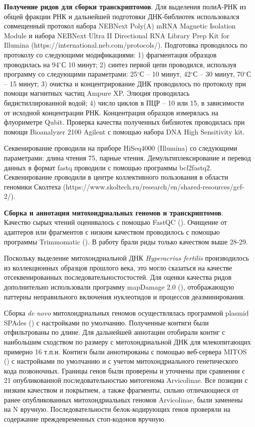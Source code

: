 \textbf{Получение ридов для сборки транскриптомов}. Для выделения полиА-РНК из общей фракции РНК и дальнейшей подготовки ДНК-библиотек использовался совмещенный протокол набора NEBNext Poly(A) mRNA Magnetic Isolation Module и набора NEBNext Ultra II Directional RNA Library Prep Kit for Illumina (https://international.neb.com/protocols/). Подготовка проводилось по протоколу со следующими модификациями: 
1) фрагментация образцов проводилась на 94$^\circ$С 10 минут; 
2) синтез первой цепи проводился, используя программу со следующими параметрами: 25$^\circ$С -- 10 минут, 42$^\circ$С -- 30 минут, 70$^\circ$С -- 15 минут; 
3) очистка и концентрирование ДНК проводилось по протоколу при помощи магнитных частиц Ampure XP. Элюция проводилась бидистиллированной водой; 
4) число циклов в ПЦР -- 10 или 15, в зависимости от исходной концентрации РНК. 
Концентрация образцов измерялась на флуориметре Qubit. Проверка качества полученных библиотек проводилась при помощи Bioanalyzer 2100 Agilent с помощью набора DNA High Sensitivity kit. 

Секвенирование проводили на приборе HiSeq4000 (Illumina) со следующими параметрами: длина чтения 75, парные чтения. Демультиплексирование и перевод данных в формат fastq проводили с помощью программы bcl2fastq2. Секвенирование проводили в центре коллективного пользования в области геномики Сколтеха (https://www.skoltech.ru/research/en/shared-resources/gcf-2/).

\textbf{Сборка и аннотация митохондриальных геномов и транскриптомов}. Качество сырых чтений оценивалось с помощью FastQC (\cite{Andrews2010}). Очищение от адаптеров или фрагментов с низким качеством проводилось с помощью программы Trimmomatic (\cite{Bolger2014}). В работу брали риды только качеством выше 28-29.

Поскольку выделение митохондриальной ДНК \textit{Hyperacrius fertilis} производилось из коллекционных образцов прошлого века, это могло сказаться на качестве отсеквенированных последовательностостостей. Для оценки качества ридов дополнительно использовали программу mapDamage 2.0 (\cite{Jonsson2013}), отображающую паттерны неправильного включения нуклеотидов и процессов деазминирования. 

Сборка \textit{de novo} митохондриальных геномов осуществлялась программой plasmid SPAdes (\cite{Bankevich2012}) с настройками по умолчанию. Полученные контиги были отфильтрованы по длине. Для дальнейшей аннотации отобирали контиг с наибольшим сходством по размеру с митохондриальной ДНК для млекопитающих примерно 16 т.п.н. Контиги были аннотированы с помощью веб-сервера MITOS (\cite{Bernt2013}) с настройками по умолчанию и с учетом митохондриального генетического кода позвоночных. Границы генов были проверены и уточнены при сравнении с 21 опубликованной последовательностью митогенома Arvicolinae. Все позиции с низким качеством и покрытием, а также фрагменты, сильно отличающиеся от ранее опубликованных митохондриальных геномов Arvicolinae, были заменены на N вручную. Последовательности белок-кодирующих генов проверяли на содержание преждевременных стоп-кодонов вручную.

